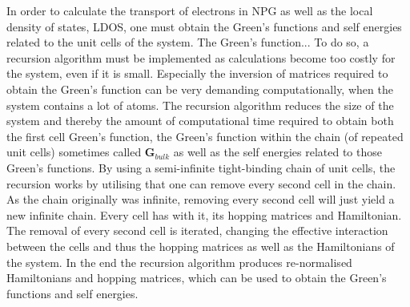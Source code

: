 In order to calculate the transport of electrons in NPG as well as the local density of states, LDOS, one must obtain the Green's functions and self energies related to the unit cells of the system. The Green's function... To do so, a recursion algorithm must be implemented as calculations become too costly for the system, even if it is small. Especially the inversion of matrices required to obtain the Green's function can be very demanding computationally, when the system contains a lot of atoms. The recursion algorithm reduces the size of the system and thereby the amount of computational time required to obtain both the first cell Green's function, the Green's function within the chain (of repeated unit cells) sometimes called \(\mathbf{G}_{bulk}\) as well as the self energies related to those Green's functions. By using a semi-infinite tight-binding chain of unit cells, the recursion works by utilising that one can remove every second cell in the chain. As the chain originally was infinite, removing every second cell will just yield a new infinite chain. Every cell has with it, its hopping matrices and Hamiltonian. The removal of every second cell is iterated, changing the effective interaction between the cells and thus the hopping matrices as well as the Hamiltonians of the system. In the end the recursion algorithm produces re-normalised Hamiltonians and hopping matrices, which can be used to obtain the Green's functions and self energies.
